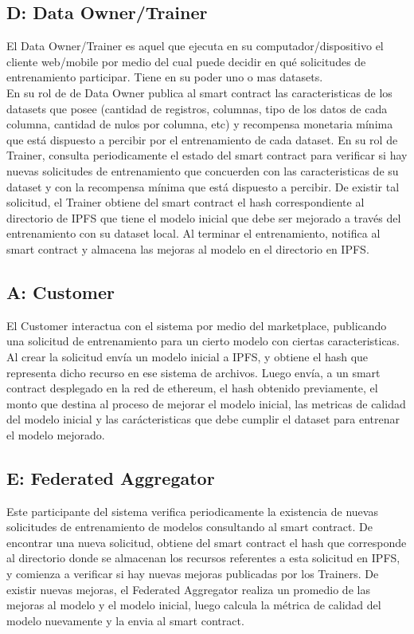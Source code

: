 \documentclass[
11pt, %
oneside, %
spanish, %
singlespacing, %
parskip, %
headsepline, %
chapterinoneline, %
]{MastersDoctoralThesis} %
\begin{document}
\subsection*{\textbf{D:} Data Owner/Trainer}
\justify
El Data Owner/Trainer es aquel que ejecuta en su computador/dispositivo el cliente web/mobile por medio del cual puede decidir en qué solicitudes de entrenamiento participar. Tiene en su poder uno o mas datasets. \\
En su rol de de Data Owner publica al smart contract las caracteristicas de los datasets que posee (cantidad de registros, columnas, tipo de los datos de cada columna, cantidad de nulos por columna, etc) y recompensa monetaria mínima que está dispuesto a percibir por el entrenamiento de cada dataset.
En su rol de Trainer, consulta periodicamente el estado del smart contract para verificar si hay nuevas solicitudes de entrenamiento que concuerden con las caracteristicas de su dataset y con la recompensa mínima que está dispuesto a percibir. De existir tal solicitud, el Trainer obtiene del smart contract el hash correspondiente al directorio de IPFS que tiene el modelo inicial que debe ser mejorado a través del entrenamiento con su dataset local. Al terminar el entrenamiento, notifica al smart contract y almacena las mejoras al modelo en el directorio en IPFS.

\subsection*{\textbf{A:} Customer}
\justify
El Customer interactua con el sistema por medio del marketplace, publicando una solicitud de entrenamiento para un cierto modelo con ciertas caracteristicas.
Al crear la solicitud envía un modelo inicial a IPFS, y obtiene el hash que representa dicho recurso en ese sistema de archivos. Luego envía, a un smart contract desplegado en la red de ethereum, el hash obtenido previamente, el monto que destina al proceso de mejorar el modelo inicial, las metricas de calidad del modelo inicial y las carácteristicas que debe cumplir el dataset para entrenar el modelo mejorado.

\subsection*{\textbf{E:} Federated Aggregator}
Este participante del sistema verifica periodicamente la existencia de nuevas solicitudes de entrenamiento de modelos consultando al smart contract. De encontrar una nueva solicitud, obtiene del smart contract el hash que corresponde al directorio donde se almacenan los recursos referentes a esta solicitud en IPFS, y comienza a verificar si hay nuevas mejoras publicadas por los Trainers. De existir nuevas mejoras, el Federated Aggregator realiza un promedio de las mejoras al modelo y el modelo inicial, luego calcula la métrica de calidad del modelo nuevamente y la envia al smart contract.
\end{document}
